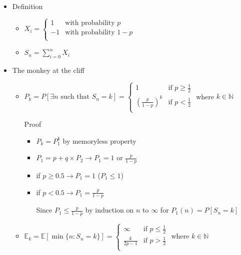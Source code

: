 \documentclass[a4paper]{article}
\begin{document}
\begin{itemize}
    \item Definition
        \begin{itemize}
            \item $X_i = \left\{ \begin{array}{ll}
                        1 & \text{with probability } p \\ 
                        -1 & \text{with probability } 1-p \\ 
                    \end{array} \right.$
            \item $S_n = \sum_{i = 0}^n X_i$
        \end{itemize}
    \item The monkey at the cliff
        \begin{itemize}
            \item $P_k = P[ \exists n \text{ such that } S_n = k] = \left\{ \begin{array}{cc}
                1 & \text{if } p \geq \frac{1}{2} \\
                (\frac{p}{1-p})^k & \text{if } p < \frac{1}{2} \\
                \end{array} \right.$ where $k \in \mathbb{N}$

                Proof
                \begin{itemize}
                    \item $P_k = P_1^k$ by memoryless property
                    \item $P_1 = p + q \times P_2 \rightarrow P_1 = 1$ or $\frac{p}{1-p}$
                    \item if $p \geq 0.5 \rightarrow P_1 = 1$ ($P_1 \leq 1$)
                    \item if $p < 0.5 \rightarrow P_1 = \frac{p}{1-p}$

                        Since $P_1 \leq \frac{p}{1-p}$ by induction on $n$ to $\infty$ for $P_1(n) = P[S_n = k]$
                \end{itemize}
            \item $\mathbb{E}_k = \mathbb{E}[\min\{n:S_n =k\}] = \left\{ \begin{array}{cc}
                \infty & \text{if } p \leq \frac{1}{2} \\
                \frac{k}{2p-1} & \text{if } p > \frac{1}{2} \\
                \end{array} \right.$ where $k \in \mathbb{N}$


\end{itemize}
\end{itemize}
\end{document}
